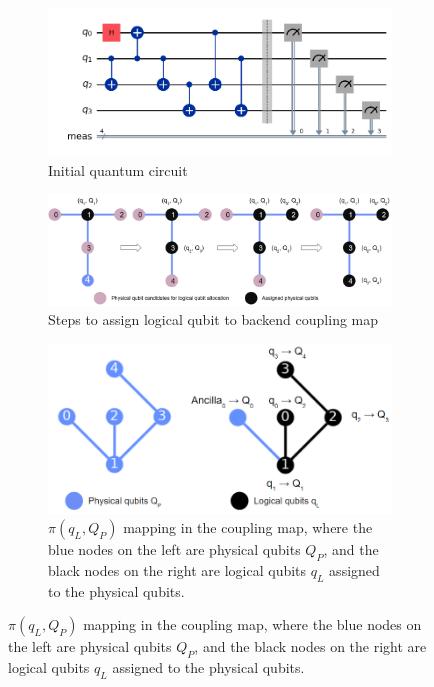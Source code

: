 \begin{figure}[htbp]
    \centering
        \begin{subfigure}{0.6\linewidth}
        \includegraphics[width=\linewidth]{image/circuit_init.png}
        \caption{Initial quantum circuit}
        \label{fig:circuit-init}
    \end{subfigure}
    \vspace{1em}
    \begin{subfigure}{0.8\linewidth}
        \includegraphics[width=\linewidth]{image/circuit_mapping.png}
        \caption{Steps to assign logical qubit to backend coupling map}
        \label{fig:circuit-mapping}
    \end{subfigure}
    \vspace{1em}
    \begin{subfigure}{0.6\linewidth}
        \includegraphics[width=\linewidth]{image/plot_circuit_layout.png}
        \caption{$\pi(q_L, Q_P)$ mapping in the coupling map, where the blue nodes on the left are physical qubits $Q_P$, and the black nodes on the right are logical qubits $q_L$ assigned to the physical qubits.}

\end{subfigure}
\end{figure}
